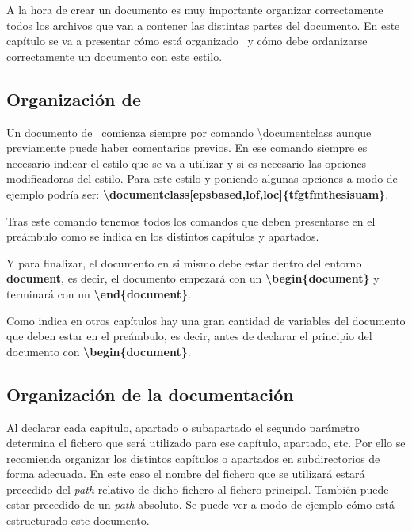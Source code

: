 A la hora de crear un documento es muy importante organizar correctamente todos los archivos que van a contener las distintas partes del documento. En este capítulo se va a presentar cómo está organizado \LaTeXe\ y cómo debe ordanizarse correctamente un documento con este estilo.

\subsection{Organización de \LaTeXe}

Un documento de \LaTeXe\ comienza siempre por comando \textbackslash documentclass aunque previamente puede haber comentarios previos. En ese comando siempre es necesario indicar el estilo que se va a utilizar y si es necesario las opciones modificadoras del estilo. Para este estilo y poniendo algunas opciones a modo de ejemplo podría ser: \textbf{\textbackslash documentclass[epsbased,lof,loc]\{tfgtfmthesisuam\}}.

Tras este comando tenemos todos los comandos que deben presentarse en el preámbulo como se indica en los distintos capítulos y apartados.

Y para finalizar, el documento en si mismo debe estar dentro del entorno \textbf{document}, es decir, el documento empezará con un \textbf{\textbackslash begin\{document\}} y terminará con un \textbf{\textbackslash end\{document\}}.

Como indica en otros capítulos hay una gran cantidad de variables del documento que deben estar en el preámbulo, es decir, antes de declarar el principio del documento con \textbf{\textbackslash begin\{document\}}.

\subsection{Organización de la documentación}

Al declarar cada capítulo, apartado o subapartado el segundo parámetro determina el fichero que será utilizado para ese capítulo, apartado, etc. Por ello se recomienda organizar los distintos capítulos o apartados en subdirectorios de forma adecuada. En este caso el nombre del fichero que se utilizará estará precedido del \textsl{path} relativo de dicho fichero al fichero principal. También puede estar precedido de un \textsl{path} absoluto. Se puede ver a modo de ejemplo cómo está estructurado este documento.

